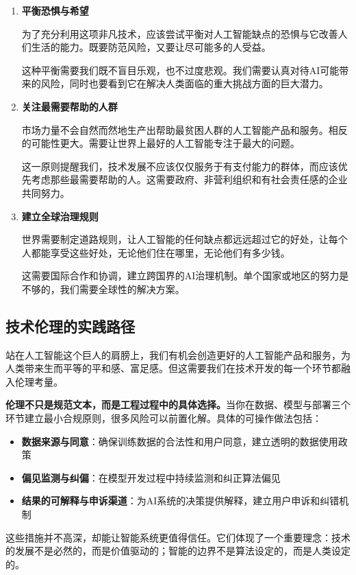 \begin{enumerate}
\item {\bf 平衡恐惧与希望}

为了充分利用这项非凡技术，应该尝试平衡对人工智能缺点的恐惧与它改善人们生活的能力。既要防范风险，又要让尽可能多的人受益。

这种平衡需要我们既不盲目乐观，也不过度悲观。我们需要认真对待AI可能带来的风险，同时也要看到它在解决人类面临的重大挑战方面的巨大潜力。

\item {\bf 关注最需要帮助的人群}

市场力量不会自然而然地生产出帮助最贫困人群的人工智能产品和服务。相反的可能性更大。需要让世界上最好的人工智能专注于最大的问题。

这一原则提醒我们，技术发展不应该仅仅服务于有支付能力的群体，而应该优先考虑那些最需要帮助的人。这需要政府、非营利组织和有社会责任感的企业共同努力。

\item {\bf 建立全球治理规则}

世界需要制定道路规则，让人工智能的任何缺点都远远超过它的好处，让每个人都能享受这些好处，无论他们住在哪里，无论他们有多少钱。

这需要国际合作和协调，建立跨国界的AI治理机制。单个国家或地区的努力是不够的，我们需要全球性的解决方案。
\end{enumerate}

\subsection{技术伦理的实践路径}

站在人工智能这个巨人的肩膀上，我们有机会创造更好的人工智能产品和服务，为人类带来生而平等的平和感、富足感。但这需要我们在技术开发的每一个环节都融入伦理考量。

{\bf 伦理不只是规范文本，而是工程过程中的具体选择。}当你在数据、模型与部署三个环节建立最小合规原则，很多风险可以前置化解。具体的可操作做法包括：

\begin{itemize}
\item {\bf 数据来源与同意}：确保训练数据的合法性和用户同意，建立透明的数据使用政策
\item {\bf 偏见监测与纠偏}：在模型开发过程中持续监测和纠正算法偏见
\item {\bf 结果的可解释与申诉渠道}：为AI系统的决策提供解释，建立用户申诉和纠错机制
\end{itemize}

这些措施并不高深，却能让智能系统更值得信任。它们体现了一个重要理念：技术的发展不是必然的，而是价值驱动的；智能的边界不是算法设定的，而是人类设定的。

